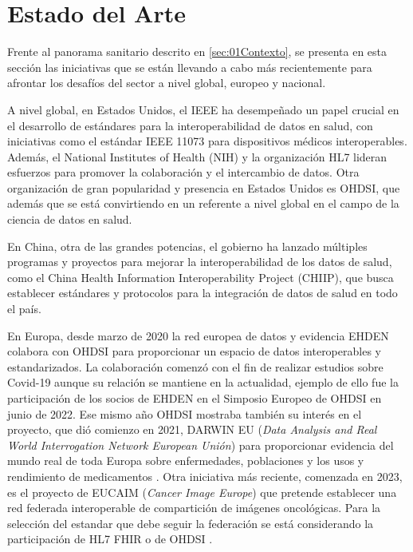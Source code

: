 \section{Estado del Arte} \label{sec:01EstadoArte} 

Frente al panorama sanitario descrito en \ref{sec:01Contexto}, se presenta en esta sección las iniciativas que se están llevando a cabo más recientemente para afrontar los desafíos del sector a nivel global, europeo y nacional.

A nivel global, en Estados Unidos, el IEEE ha desempeñado un papel crucial en el desarrollo de estándares para la interoperabilidad de datos en salud, con iniciativas como el estándar IEEE 11073 para dispositivos médicos interoperables. Además, el National Institutes of Health (NIH) y la organización HL7 lideran esfuerzos para promover la colaboración y el intercambio de datos. Otra organización de gran popularidad y presencia en Estados Unidos es OHDSI, que además que se está convirtiendo en un referente a nivel global en el campo de la ciencia de datos en salud.

En China, otra de las grandes potencias, el gobierno ha lanzado múltiples programas y proyectos para mejorar la interoperabilidad de los datos de salud, como el China Health Information Interoperability Project (CHIIP), que busca establecer estándares y protocolos para la integración de datos de salud en todo el país.


En Europa, desde marzo de 2020 la red europea de datos y evidencia EHDEN colabora con OHDSI para proporcionar un espacio de datos interoperables y estandarizados. La colaboración comenzó con el fin de realizar estudios sobre Covid-19 aunque su relación se mantiene en la actualidad, ejemplo de ello fue la participación de los socios de EHDEN en el Simposio Europeo de OHDSI en junio de 2022. Ese mismo año OHDSI mostraba también su interés en el proyecto, que dió comienzo en 2021, DARWIN EU (\textit{Data Analysis and Real World Interrogation Network European Unión}) \cite{OHDSI2023Darwin} para proporcionar evidencia del mundo real de toda Europa sobre enfermedades, poblaciones y los usos y rendimiento de medicamentos \cite{Darwin2023website}. Otra iniciativa más reciente, comenzada en 2023, es el proyecto de EUCAIM (\textit{Cancer Image Europe}) que pretende establecer una red federada interoperable de compartición de imágenes oncológicas. Para la selección del estandar que debe seguir la federación se está considerando la participación de HL7 FHIR o de OHDSI \cite{Kalokyri2023Early}.

